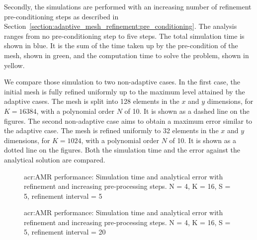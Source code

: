 Secondly, the simulations are performed with an increasing number of refinement pre-conditioning
steps as described in Section~\ref{section:adaptive_mesh_refinement:pre_conditioning}. The analysis
ranges from no pre-conditioning step to five steps. The total simulation time is shown in blue. It
is the sum of the time taken up by the pre-condition of the mesh, shown in green, and the
computation time to solve the problem, shown in yellow. 

We compare those simulation to two non-adaptive cases. In the first case, the initial mesh is fully
refined uniformly up to the maximum level attained by the adaptive cases. The mesh is split into 128
elements in the \(x\) and \(y\) dimensions, for \(K = 16384\), with a polynomial order \(N\) of 10.
It is shown as a dashed line on the figures. The second non-adaptive case aims to obtain a maximum
error similar to the adaptive case. The mesh is refined uniformly to 32 elements in the \(x\) and
\(y\) dimensions, for \(K = 1024\), with a polynomial order \(N\) of 10. It is shown as a dotted
line on the figures. Both the simulation time and the error against the analytical solution
are compared.


\begin{figure}[H]
	\centering
	\caption{\Acrlong{acr:AMR} performance: Simulation time and analytical error with refinement and increasing pre-processing steps. N = 4, K = 16, S = 5, refinement interval = 5}\label{fig:adaptivity_efficiency_A5}
\end{figure}

\begin{figure}[H]
	\centering
	\hfill
	\caption{\Acrlong{acr:AMR} performance: Simulation time and analytical error with refinement and increasing pre-processing steps. N = 4, K = 16, S = 5, refinement interval = 20}\label{fig:adaptivity_efficiency_A20}
\end{figure}

